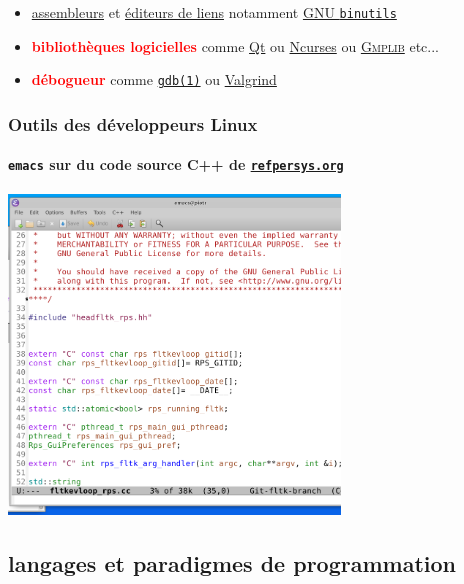 \documentclass[xcolor=svgnames,final,smaller,a4]{beamer}
\begin{document}
\begin{frame}
\begin{relsize}{-1}
\begin{itemize}
    
    \item \href{https://fr.wikipedia.org/wiki/Programme_assembleur}{assembleurs} et \href{https://fr.wikipedia.org/wiki/Édition_de_liens}{éditeurs de liens} notamment \href{https://fr.wikipedia.org/wiki/GNU\_Binutils}{GNU \texttt{binutils}} 
    
    \item \textbf{\textcolor{red}{bibliothèques logicielles}} comme
      \href{https://qt.io}{Qt} ou
      \href{https://fr.wikipedia.org/wiki/Ncurses}{Ncurses} ou
      \href{http://gmplib.org/}{\textsc{Gmplib}} etc...
      
    \item  \textbf{\textcolor{red}{débogueur}} comme 
    \href{https://man7.org/linux/man-pages/man1/gdb.1.html}{\texttt{gdb(1)}} ou \href{https://fr.wikipedia.org/wiki/Valgrind}{Valgrind}
      
  \end{itemize}
  \end{relsize}
\end{frame}

\begin{frame}
  \frametitle{Outils des développeurs Linux}
  \framesubtitle{\texttt{emacs} sur du code source C++ de \href{http://refpersys.org/}{\texttt{refpersys.org}}}

  \vspace{0.1cm}
  
    \includegraphics[width=0.66\textwidth]{emacs-refpersys} 
\end{frame}

\subsection{langages et paradigmes de programmation}
\end{document}
